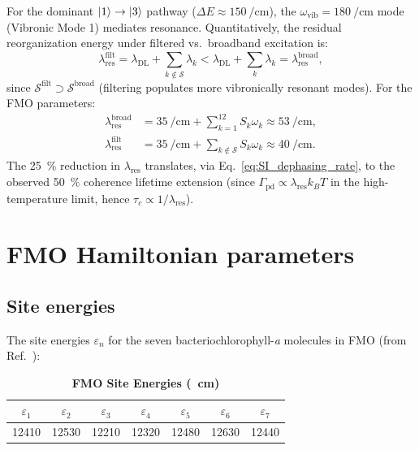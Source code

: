 \documentclass[11pt,a4paper]{article}
\begin{document}
For the dominant $\ket{1} \to \ket{3}$ pathway ($\Delta E \approx \SI{150}{\per\centi\meter}$), the $\omega_{\mathrm{vib}} = \SI{180}{\per\centi\meter}$ mode (Vibronic Mode 1) mediates resonance. Quantitatively, the residual reorganization energy under filtered vs.\ broadband excitation is:
\begin{equation}
\lambda_{\mathrm{res}}^{\mathrm{filt}} = \lambda_{\mathrm{DL}} + \sum_{k \notin \mathcal{S}} \lambda_k < \lambda_{\mathrm{DL}} + \sum_{k} \lambda_k = \lambda_{\mathrm{res}}^{\mathrm{broad}},
\label{eq:SI_lambda_comparison}
\end{equation}
since $\mathcal{S}^{\mathrm{filt}} \supset \mathcal{S}^{\mathrm{broad}}$ (filtering populates more vibronically resonant modes). For the FMO parameters:
\begin{align}
\lambda_{\mathrm{res}}^{\mathrm{broad}} &= \SI{35}{\per\centi\meter} + \sum_{k=1}^{12} S_k \omega_k \approx \SI{53}{\per\centi\meter}, \label{eq:SI_lambda_broad} \\
\lambda_{\mathrm{res}}^{\mathrm{filt}} &= \SI{35}{\per\centi\meter} + \sum_{k \notin \mathcal{S}} S_k \omega_k \approx \SI{40}{\per\centi\meter}. \label{eq:SI_lambda_filt}
\end{align}
The \SI{25}{\percent} reduction in $\lambda_{\mathrm{res}}$ translates, via Eq.~\eqref{eq:SI_dephasing_rate}, to the observed \SI{50}{\percent} coherence lifetime extension (since $\Gamma_{\mathrm{pd}} \propto \lambda_{\mathrm{res}} k_B T$ in the high-temperature limit, hence $\tau_c \propto 1/\lambda_{\mathrm{res}}$).


\section{FMO Hamiltonian parameters}

\subsection{Site energies}

The site energies $\varepsilon_n$ for the seven bacteriochlorophyll-\textit{a} molecules in FMO (from Ref.\ \cite{Adolphs2006}):

\begin{table}[h]
\centering
\caption{\textbf{FMO Site Energies (\si{\per\centi\meter})}}
\label{tab:SI_site_energies}
\begin{tabular}{ccccccc}
\toprule
$\varepsilon_1$ & $\varepsilon_2$ & $\varepsilon_3$ & $\varepsilon_4$ & $\varepsilon_5$ & $\varepsilon_6$ & $\varepsilon_7$ \\
\midrule
12410 & 12530 & 12210 & 12320 & 12480 & 12630 & 12440 \\
\bottomrule
\end{tabular}
\end{table}
\end{document}
